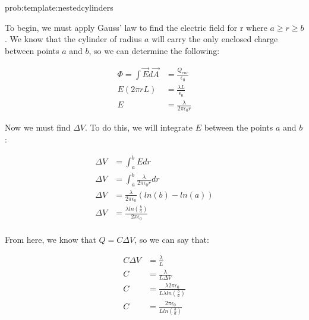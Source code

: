 \begin{solution}{prob:template:nestedcylinders}\label{soln:template:nestedcylinders}
	
	
	To begin, we must apply Gauss' law to find the electric field for r where $a\geq r\geq b$. We know that the cylinder of radius $a$ will carry the only enclosed charge between points $a$ and $b$, so we can determine the following:
	
	\begin{align*}
	\Phi = \int \vec E d \vec A &= \frac{Q_{enc}}{\epsilon_0}\\
	E(2\pi r L)&= \frac{\lambda L}{\epsilon_0}\\
	E&= \frac{\lambda}{2\pi \epsilon_0 r}
	\end{align*}
	
	
	Now we must find $\Delta V$. To do this, we will integrate $E$ between the points $a$ and $b$:
	
	\begin{align*}
	\Delta V &= \int_{a}^{b} E dr\\
	\Delta V &= \int_{a}^{b}\frac{\lambda}{2\pi \epsilon_0 r} dr\\
	\Delta V &= \frac{\lambda}{2\pi \epsilon_0} (ln(b)-ln(a)) \\
	\Delta V &= \frac{\lambda ln(\frac{b}{a})}{2\pi \epsilon_0}\\
	\end{align*}
	
	From here, we know that $Q = C\Delta V$, so we can say that:
	
	\begin{align*}
	C\Delta V&=\frac{\lambda}{L}\\
	C &= \frac{\lambda}{L\Delta V}\\
	C & = \frac{\lambda 2\pi \epsilon_0}{L \lambda ln(\frac{b}{a})}\\
	C & = \frac{2\pi \epsilon_0}{L ln(\frac{b}{a})}
	\end{align*}
	
\end{solution}
